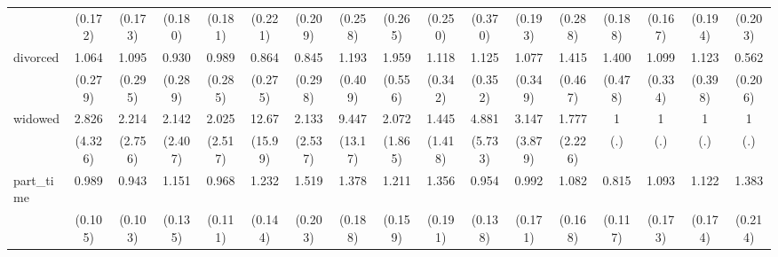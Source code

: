 {\begin{tabular}{l*{16}{c}}
                    &     (0.172)         &     (0.173)         &     (0.180)         &     (0.181)         &     (0.221)         &     (0.209)         &     (0.258)         &     (0.265)         &     (0.250)         &     (0.370)         &     (0.193)         &     (0.288)         &     (0.188)         &     (0.167)         &     (0.194)         &     (0.203)         \\
[1em]
divorced            &       1.064         &       1.095         &       0.930         &       0.989         &       0.864         &       0.845         &       1.193         &       1.959\sym{*}  &       1.118         &       1.125         &       1.077         &       1.415         &       1.400         &       1.099         &       1.123         &       0.562         \\
                    &     (0.279)         &     (0.295)         &     (0.289)         &     (0.285)         &     (0.275)         &     (0.298)         &     (0.409)         &     (0.556)         &     (0.342)         &     (0.352)         &     (0.349)         &     (0.467)         &     (0.478)         &     (0.334)         &     (0.398)         &     (0.206)         \\
[1em]
widowed             &       2.826         &       2.214         &       2.142         &       2.025         &       12.67\sym{*}  &       2.133         &       9.447         &       2.072         &       1.445         &       4.881         &       3.147         &       1.777         &           1         &           1         &           1         &           1         \\
                    &     (4.326)         &     (2.756)         &     (2.407)         &     (2.517)         &     (15.99)         &     (2.537)         &     (13.17)         &     (1.865)         &     (1.418)         &     (5.733)         &     (3.879)         &     (2.226)         &         (.)         &         (.)         &         (.)         &         (.)         \\
[1em]
part\_time           &       0.989         &       0.943         &       1.151         &       0.968         &       1.232         &       1.519\sym{**} &       1.378\sym{*}  &       1.211         &       1.356\sym{*}  &       0.954         &       0.992         &       1.082         &       0.815         &       1.093         &       1.122         &       1.383\sym{*}  \\
                    &     (0.105)         &     (0.103)         &     (0.135)         &     (0.111)         &     (0.144)         &     (0.203)         &     (0.188)         &     (0.159)         &     (0.191)         &     (0.138)         &     (0.171)         &     (0.168)         &     (0.117)         &     (0.173)         &     (0.174)         &     (0.214)         \\

\end{tabular}}
